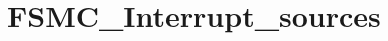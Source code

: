 \hypertarget{group___f_s_m_c___interrupt__sources}{\section{F\-S\-M\-C\-\_\-\-Interrupt\-\_\-sources}
\label{group___f_s_m_c___interrupt__sources}
}
